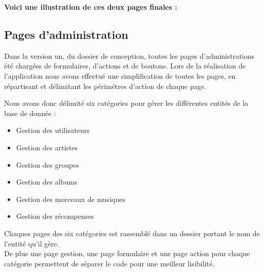             \begin{paragraphe}
                \textbf{Voici une illustration de ces deux pages finales :}
            \end{paragraphe}



	\clearpage

	\subsection{Pages d'administration}
        
        \begin{paragraphe}
            Dans la version un, du dossier de conception, toutes les pages d'administrations été chargées de formulaires, d'actions et de boutons.
            Lors de la réalisation de l'application nous avons effectué une simplification de toutes les pages, en répartisant et délimitant les périmétres d'action de chaque page.
        \end{paragraphe}
    
        \begin{paragraphe}
            Nous avons donc délimité six catégories pour gérer les différentes entités de la base de donnée :
            \vspace{1em}
            \begin{itemize}
                \item Gestion des utilisateurs
                \item Gestion des artistes
                \item Gestion des groupes
                \item Gestion des albums
                \item Gestion des morceaux de musiques
                \item Gestion des récompenses
            \end{itemize}
        \end{paragraphe}
        
        \begin{paragraphe}
            Chaques pages des six catégories est rassemblé dans un dossier portant le nom de l'entité qu'il gère. \\
            De plus une page gestion, une page formulaire et une page action pour chaque catégorie permettent de séparer le code pour une meilleur lisibilité.
        \end{paragraphe}

